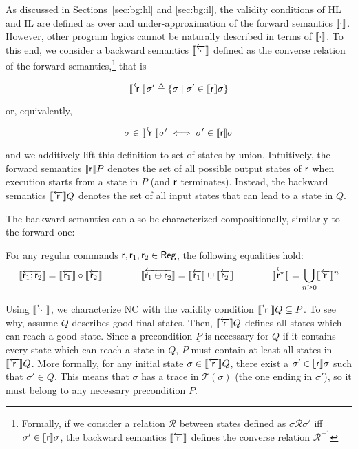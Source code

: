 As discussed in Sections~\ref{sec:bg:hl} and \ref{sec:bg:il}, the validity conditions of HL and IL are defined as over and under-approximation of the forward semantics $\llbracket\cdot\rrbracket$. However, other program logics cannot be naturally described in terms of $\llbracket\cdot\rrbracket$. To this end, we consider a backward semantics $\llbracket\overleftarrow{\cdot}\rrbracket$ defined as the converse relation of the forward semantics,\footnote{Formally, if we consider a relation $\mathcal{R}$ between states defined as $\sigma \mathcal{R} \sigma'$ iff $\sigma' \in \llbracket\mathsf{r}\rrbracket \sigma$, the backward semantics $\llbracket\overleftarrow{\mathsf{r}}\rrbracket$ defines the converse relation $\mathcal{R}^{-1}$} that is

\begin{equation}
	\llbracket\overleftarrow{\mathsf{r}}\rrbracket \sigma' \triangleq \{ \sigma \mid \sigma' \in \llbracket\mathsf{r}\rrbracket \sigma \} \label{eq:sil:bwsem-definition}
\end{equation}

\noindent or, equivalently,

\begin{equation}
	\sigma \in \llbracket\overleftarrow{\mathsf{r}}\rrbracket \sigma' \iff \sigma' \in \llbracket\mathsf{r}\rrbracket \sigma  \label{eq:sil:bwsem-sigma-sigma'}
\end{equation}

\noindent and we additively lift this definition to set of states by union.
Intuitively, the forward semantics $\llbracket\mathsf{r}\rrbracket P$ denotes the set of all possible output states of $\mathsf{r}$ when execution starts from a state in $P$ (and $\mathsf{r}$ terminates).
Instead, the backward semantics $\llbracket\overleftarrow{\mathsf{r}}\rrbracket Q$ denotes the set of all input states that can lead to a state in $Q$.

The backward semantics can also be characterized compositionally, similarly to the forward one:

\begin{lemma}\label{lmm:sil:bwsem-calculus}
	For any regular commands $\mathsf{r},\mathsf{r}_1,\mathsf{r}_2\in \mathsf{Reg}$, the following equalities hold:
	\[
	\llbracket\overleftarrow{\mathsf{r}_1; \mathsf{r}_2}\rrbracket = \llbracket\overleftarrow{\mathsf{r}_1}\rrbracket \circ \llbracket\overleftarrow{\mathsf{r}_2}\rrbracket \qquad\qquad
	\llbracket\overleftarrow{\mathsf{r}_1 \oplus \mathsf{r}_2}\rrbracket = \llbracket\overleftarrow{\mathsf{r}_1}\rrbracket \cup \llbracket\overleftarrow{\mathsf{r}_2}\rrbracket \qquad\qquad
	\llbracket\overleftarrow{{\mathsf{r}^\star}}\rrbracket = \bigcup\limits_{n \ge 0} \llbracket\overleftarrow{\mathsf{r}}\rrbracket^n
	\]
\end{lemma}

Using $\llbracket\overleftarrow{\cdot}\rrbracket$, we characterize NC with the validity condition $\llbracket\overleftarrow{\mathsf{r}}\rrbracket Q \subseteq P$.
To see why, assume $Q$ describes good final states. Then, $\llbracket\overleftarrow{\mathsf{r}}\rrbracket Q$ defines all states which can reach a good state. Since a precondition $\underline{P}$ is necessary for $Q$ if it contains every state which can reach a state in $Q$, $\underline{P}$ must contain at least all states in $\llbracket\overleftarrow{\mathsf{r}}\rrbracket Q$. More formally, for any initial state $\sigma \in \llbracket\overleftarrow{\mathsf{r}}\rrbracket Q$, there exist a $\sigma' \in \llbracket\mathsf{r}\rrbracket \sigma$ such that $\sigma' \in Q$. This means that $\sigma$ has a trace in $\mathcal{T}(\sigma)$ (the one ending in $\sigma'$), so it must belong to any necessary precondition $\underline{P}$.

